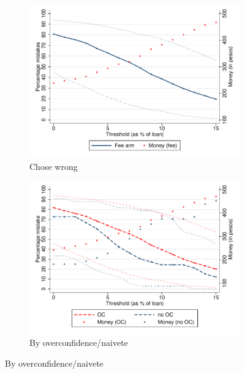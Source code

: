 \documentclass[oneside,11pt]{article}
\begin{document}
\begin{figure}[H]
    \caption{Choice of contracts and treatment effects}
    \label{choose_wrong}
    \begin{center}
        \begin{subfigure}{0.45\textwidth}
        \caption{Chose wrong}
        \centering
        \includegraphics[width=\textwidth]{Figuras/line_cw_fc_te_cf.pdf}
        
    \end{subfigure}
        \begin{subfigure}{0.45\textwidth}
        \caption{By overconfidence/naivete}
        \centering
        \includegraphics[width=\textwidth]{Figuras/line_cw_fc_te_cf_OC_fee.pdf}

    \bigskip
        

\end{subfigure}
\end{center}
\end{figure}
\end{document}
